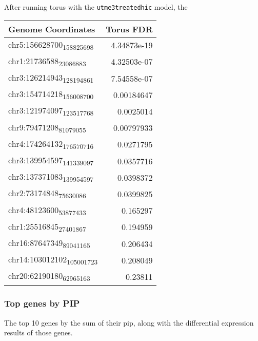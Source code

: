 After running torus with the \texttt{utme3treatedhic} model, the 

\begin{center}
\begin{tabular}{lr}
Genome Coordinates & Torus FDR\\
\hline
chr5:156628700\textsubscript{158825698} & 4.34873e-19\\
chr1:21736588\textsubscript{23086883} & 4.32503e-07\\
chr3:126214943\textsubscript{128194861} & 7.54558e-07\\
chr3:154714218\textsubscript{156008700} & 0.00184647\\
chr3:121974097\textsubscript{123517768} & 0.0025014\\
chr9:79471208\textsubscript{81079055} & 0.00797933\\
chr4:174264132\textsubscript{176570716} & 0.0271795\\
chr3:139954597\textsubscript{141339097} & 0.0357716\\
chr3:137371083\textsubscript{139954597} & 0.0398372\\
chr2:73174848\textsubscript{75630086} & 0.0399825\\
chr4:48123600\textsubscript{53877433} & 0.165297\\
chr1:25516845\textsubscript{27401867} & 0.194959\\
chr16:87647349\textsubscript{89041165} & 0.206434\\
chr14:103012102\textsubscript{105001723} & 0.208049\\
chr20:62190180\textsubscript{62965163} & 0.23811\\
\end{tabular}
\end{center}




\subsubsection{Top genes by PIP}\label{sec:org28d8484}

The top 10 genes by the sum of their pip, along with the differential expression results of those genes.


